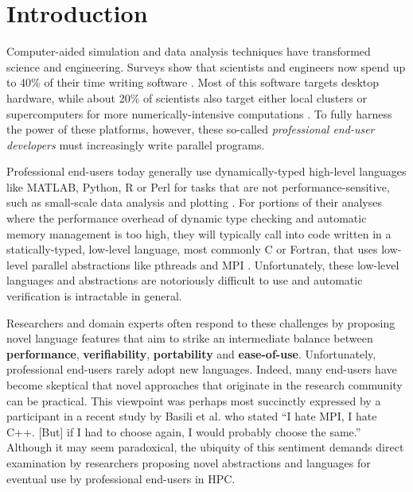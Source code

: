 \documentclass{sig-alternate}
\begin{document}


%



\section{Introduction}

Computer-aided simulation and data analysis techniques have transformed science and engineering. Surveys show that scientists and engineers now spend up to 40\% of their time writing software \cite{howison2011scientific, hannay2009scientists}. Most of this software targets desktop hardware, while about 20\% of scientists also target either local clusters or super\-computers for more numerically-intensive computations \cite{hannay2009scientists}. To fully harness the power of these platforms, however, these so-called {\em professional end-user developers} \cite{segal2007some} must increasingly write parallel programs.

Professional end-users today generally use dynamically-typed high-level languages like MATLAB, Python, R or Perl for tasks that are not performance-sensitive, such as small-scale data analysis and plotting \cite{nguyen2010survey}. For portions of their analyses where the performance overhead of dynamic type checking and automatic memory management is too high, they will typically call into code written in a statically-typed, low-level language, most commonly C or Fortran, that uses low-level parallel abstractions like pthreads and MPI \cite{4222616,basili2008understanding}. Unfortunately, these low-level languages and abstractions are notoriously difficult to use and automatic verification is intractable in general.

Researchers and domain experts often respond to these challenges by proposing novel language features that aim to strike an intermediate balance between \textbf{performance}, \textbf{verifiability\-}, \textbf{portability} and \textbf{ease-of-use}.
Unfortunately, professional end-users rarely adopt new languages. Indeed, many end-users have become skeptical that novel approaches that originate in the research community can be  practical. This viewpoint was perhaps most succinctly expressed by a participant in a recent study by Basili et al. \cite{basili2008understanding} who stated ``I hate MPI, I hate C++. [But] if I had to choose again, I would probably choose the same.'' Although it may seem paradoxical, the ubiquity of this sentiment demands direct examination by researchers proposing novel abstractions and languages for eventual use by professional end-users in HPC.
\end{document}
